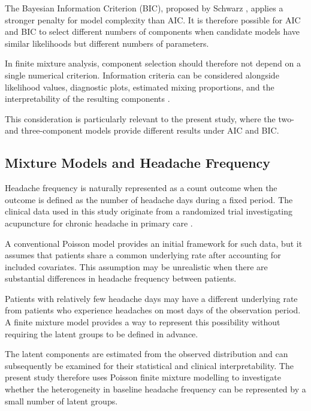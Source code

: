 The Bayesian Information Criterion (BIC), proposed by Schwarz
\citep{Schwarz1978}, applies a stronger penalty for model complexity
than AIC. It is therefore possible for AIC and BIC to select
different numbers of components when candidate models have similar
likelihoods but different numbers of parameters.

In finite mixture analysis, component selection should therefore not
depend on a single numerical criterion. Information criteria can be
considered alongside likelihood values, diagnostic plots, estimated
mixing proportions, and the interpretability of the resulting
components \citep{McLachlanPeel2000}.

This consideration is particularly relevant to the present study,
where the two- and three-component models provide different results
under AIC and BIC.


\subsection{Mixture Models and Headache Frequency}

Headache frequency is naturally represented as a count outcome when
the outcome is defined as the number of headache days during a fixed
period. The clinical data used in this study originate from a
randomized trial investigating acupuncture for chronic headache in
primary care \citep{Vickers2004}.

A conventional Poisson model provides an initial framework for such
data, but it assumes that patients share a common underlying rate
after accounting for included covariates. This assumption may be
unrealistic when there are substantial differences in headache
frequency between patients.

Patients with relatively few headache days may have a different
underlying rate from patients who experience headaches on most days
of the observation period. A finite mixture model provides a way to
represent this possibility without requiring the latent groups to be
defined in advance.

The latent components are estimated from the observed distribution
and can subsequently be examined for their statistical and clinical
interpretability. The present study therefore uses Poisson finite
mixture modelling to investigate whether the heterogeneity in
baseline headache frequency can be represented by a small number of
latent groups.


